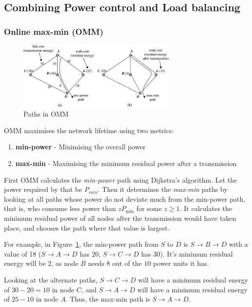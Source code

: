 
\subsection{Combining Power control and Load balancing}

\subsubsection{Online max-min (OMM)}
\begin{figure}
\centering
\includegraphics[width=0.7\textwidth]{images/omm}
\caption{Paths in OMM\cite{alotaibi2012survey}}
\label{ommex}
\end{figure}
\label{omm}
OMM \cite{li2001online} maximises the network lifetime using two metrics:
\begin{enumerate}
  \item \textbf{min-power} - Minimising the overall power
  \item \textbf{max-min} - Maximising the minimum residual power after a transmission
\end{enumerate}

First OMM calculates the \textit{min-power} path using Dijkstra’s algorithm. Let
the power required by that be $P_{min}$.
Then it determines the \textit{max-min} paths by looking at all paths whose
power do not deviate much from the min-power path, that is, who consume less
power than $zP_{\min}$ for some $z \ge 1$. It calculates the minimum residual power of all nodes
after the transmission would have taken place, and chooses the path where
that value is largest.

For example, in Figure~\ref{ommex}, the min-power path from
$S$ to $D$ is $S \to B \to D$ with a value of 18 ($S \to A \to D$ has 20,
$S \to C \to D$ has 30).
It's minimum residual energy will be $2$, as node $B$ needs
$8$ out of the $10$ power units it has.

Looking at the alternate paths, $S \to C \to D$ will have a
minimum residual energy of $30-20=10$ in node $C$, and $S \to A \to D$ will
have a minimum residual energy of $25-10$ in node $A$.
Thus, the max-min path is $S \to A \to D$.

